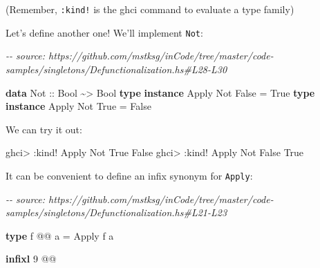 \documentclass[]{article}
\newenvironment{Shaded}{}{}
\newcommand{\CommentTok}[1]{\textcolor[rgb]{0.38,0.63,0.69}{\textit{#1}}}
\newcommand{\DataTypeTok}[1]{\textcolor[rgb]{0.56,0.13,0.00}{#1}}
\newcommand{\DecValTok}[1]{\textcolor[rgb]{0.25,0.63,0.44}{#1}}
\newcommand{\KeywordTok}[1]{\textcolor[rgb]{0.00,0.44,0.13}{\textbf{#1}}}
\newcommand{\NormalTok}[1]{#1}
\newcommand{\OperatorTok}[1]{\textcolor[rgb]{0.40,0.40,0.40}{#1}}
\newcommand{\OtherTok}[1]{\textcolor[rgb]{0.00,0.44,0.13}{#1}}
\begin{document}
(Remember, \texttt{:kind!} is the ghci command to evaluate a type family)

Let's define another one! We'll implement \texttt{Not}:

\begin{Shaded}
\begin{Highlighting}[]
\CommentTok{{-}{-} source: https://github.com/mstksg/inCode/tree/master/code{-}samples/singletons/Defunctionalization.hs\#L28{-}L30}

\KeywordTok{data} \DataTypeTok{Not}\OtherTok{ ::} \DataTypeTok{Bool} \OperatorTok{\textasciitilde{}\textgreater{}} \DataTypeTok{Bool}
\KeywordTok{type} \KeywordTok{instance} \DataTypeTok{Apply} \DataTypeTok{Not} \DataTypeTok{\textquotesingle{}False} \OtherTok{=} \DataTypeTok{\textquotesingle{}True}
\KeywordTok{type} \KeywordTok{instance} \DataTypeTok{Apply} \DataTypeTok{Not} \DataTypeTok{\textquotesingle{}True}  \OtherTok{=} \DataTypeTok{\textquotesingle{}False}
\end{Highlighting}
\end{Shaded}

We can try it out:

\begin{Shaded}
\begin{Highlighting}[]
\NormalTok{ghci}\OperatorTok{\textgreater{}} \OperatorTok{:}\NormalTok{kind}\OperatorTok{!} \DataTypeTok{Apply} \DataTypeTok{Not} \DataTypeTok{\textquotesingle{}True}
\DataTypeTok{\textquotesingle{}False}
\NormalTok{ghci}\OperatorTok{\textgreater{}} \OperatorTok{:}\NormalTok{kind}\OperatorTok{!} \DataTypeTok{Apply} \DataTypeTok{Not} \DataTypeTok{\textquotesingle{}False}
\DataTypeTok{\textquotesingle{}True}
\end{Highlighting}
\end{Shaded}

It can be convenient to define an infix synonym for \texttt{Apply}:

\begin{Shaded}
\begin{Highlighting}[]
\CommentTok{{-}{-} source: https://github.com/mstksg/inCode/tree/master/code{-}samples/singletons/Defunctionalization.hs\#L21{-}L23}

\KeywordTok{type}\NormalTok{ f }\OperatorTok{@@}\NormalTok{ a }\OtherTok{=} \DataTypeTok{Apply}\NormalTok{ f a}

\KeywordTok{infixl} \DecValTok{9} \OperatorTok{@@}
\end{Highlighting}
\end{Shaded}
\end{document}
